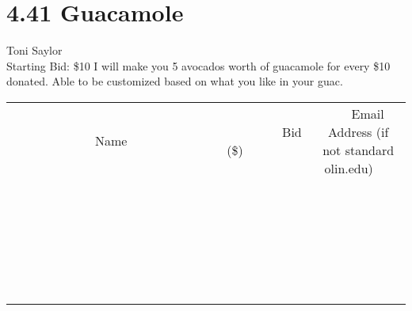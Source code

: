 \documentclass[11pt]{article}
\begin{document}
\section*{4.41 Guacamole}
Toni Saylor
\\
Starting Bid: \$10
\newline
I will make you 5 avocados worth of guacamole for every \$10 donated. Able to be customized based on what you like in your guac.
\\[6ex]
\begin{tabular}{c c c}
~~~~~~~~~~~~~Name~~~~~~~~~~~~~ & ~~~~~~~~~Bid (\$)~~~~~~~~~  & ~~~Email Address (if not standard olin.edu)~~~\\
 & & \\
\hline
 & & \\
\hline
 & & \\
\hline
 & & \\
\hline
 & & \\
\hline
 & & \\
\hline
 & & \\
\hline
 & & \\
\hline
 & & \\
\hline
 & & \\
\hline
 & & \\
\hline
 & & \\
\hline
 & & \\
\hline
 & & \\
\hline
 & & \\
\hline
 & & \\
\hline
 & & \\
\hline
 & & \\
\hline
 & & \\
\hline
 & & \\
\hline
 & & \\
\hline
 & & \\
\hline
 & & \\
\hline
 & & \\
\hline
 & & \\
\hline
 & & \\
\hline
\end{tabular}
\newpage
\end{document}
